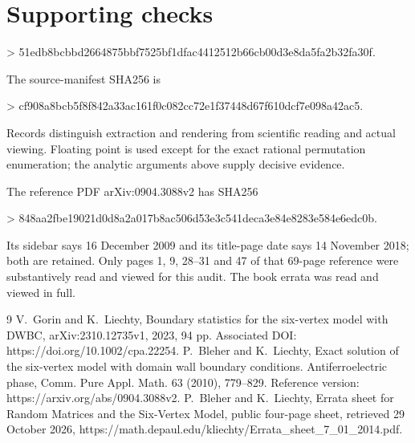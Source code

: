 \documentclass[10pt]{article}
\begin{document}
\section*{Supporting checks}
> 51edb8bcbbd2664875bbf7525bf1dfac4412512b66cb00d3e8da5fa2b32fa30f.\par
The source-manifest SHA256 is\par
> cf908a8bcb5f8f842a33ac161f0c082cc72e1f37448d67f610dcf7e098a42ac5.\par
Records distinguish extraction and rendering from scientific reading and actual viewing. Floating point is used except for the exact rational permutation enumeration; the analytic arguments above supply decisive evidence.\par
The reference PDF arXiv:0904.3088v2 has SHA256\par
> 848aa2fbe19021d0d8a2a017b8ac506d53e3c541deca3e84e8283e584e6edc0b.\par
Its sidebar says 16 December 2009 and its title-page date says 14 November 2018; both are retained. Only pages 1, 9, 28–31 and 47 of that 69-page reference were substantively read and viewed for this audit. The book errata was read and viewed in full.\par
9 V. Gorin and K. Liechty, Boundary statistics for the six-vertex model with DWBC, arXiv:2310.12735v1, 2023, 94 pp. Associated DOI: https://doi.org/10.1002/cpa.22254. P. Bleher and K. Liechty, Exact solution of the six-vertex model with domain wall boundary conditions. Antiferroelectric phase, Comm. Pure Appl. Math. 63 (2010), 779–829. Reference version: https://arxiv.org/abs/0904.3088v2. P. Bleher and K. Liechty, Errata sheet for Random Matrices and the Six-Vertex Model, public four-page sheet, retrieved 29 October 2026, https://math.depaul.edu/kliechty/Errata\_sheet\_7\_01\_2014.pdf.\par
\end{document}
